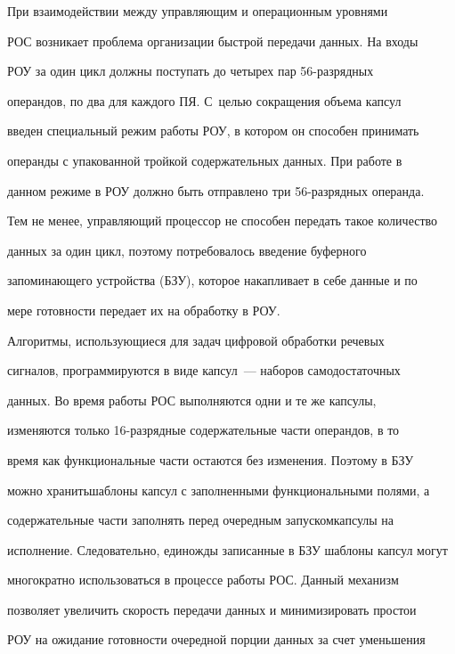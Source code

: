       При взаимодействии между управляющим и операционным уровнями 


РОС возникает проблема организации быстрой передачи данных. На входы 


РОУ за один цикл должны поступать до четырех пар 56-раз\-ряд\-ных 


операндов, по два для каждого ПЯ. С~целью сокращения объема капсул 


введен специальный режим работы РОУ, в котором он способен принимать 


операнды с упакованной тройкой содержательных данных. При работе в 


данном режиме в РОУ должно быть отправлено три 56-раз\-ряд\-ных операнда. 


Тем не менее, управляющий процессор не способен передать такое количество 


данных за один цикл, поэтому потребовалось введение буферного 


запоминающего устройства (БЗУ), которое накапливает в себе данные и по 


мере готовности передает их на обработку в РОУ.


      


      Алгоритмы, использующиеся для задач цифровой обработки речевых 


сигналов, программируются в виде капсул~--- наборов самодостаточных 


данных. Во время работы РОС выполняются одни и те же капсулы, 


изменяются только 16-раз\-ряд\-ные содержательные час\-ти операндов, в то 


время как функциональные час\-ти остаются без изменения. Поэтому в БЗУ 


можно хранить\linebreak шаблоны кап\-сул с заполненными функциональными полями, а 


содержательные части заполнять перед очередным запуском\linebreak кап\-су\-лы на 


исполнение. Следовательно, единожды записанные в БЗУ шаблоны капсул могут 


многократно использоваться в процессе работы РОС. Данный механизм 


позволяет увеличить скорость передачи данных и минимизировать простои 


РОУ на ожидание готовности очередной порции данных за счет уменьшения 


